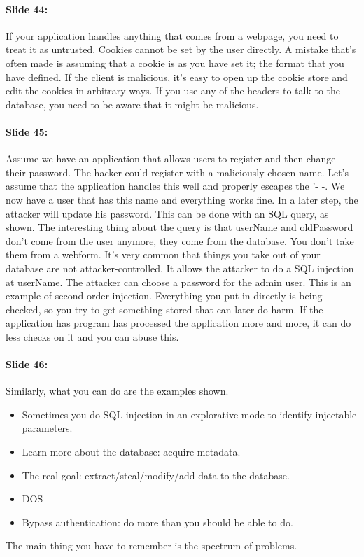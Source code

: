 \documentclass[10pt,a4paper]{report}
\begin{document}
\paragraph{Slide 44:} If your application handles anything that comes from a webpage, you need to treat it as untrusted. Cookies cannot be set by the user directly. A mistake that's often made is assuming that a cookie is as you have set it; the format that you have defined. If the client is malicious, it's easy to open up the cookie store and edit the cookies in arbitrary ways. If you use any of the headers to talk to the database, you need to be aware that it might be malicious. 

\paragraph{Slide 45:} Assume we have an application that allows users to register and then change their password. The hacker could register with a maliciously chosen name. Let's assume that the application handles this well and properly escapes the '- -. We now have a user that has this name and everything works fine. In a later step, the attacker will update his password. This can be done with an SQL query, as shown. The interesting thing about the query is that userName and oldPassword don't come from the user anymore, they come from the database. You don't take them from a webform. It's very common that things you take out of your database are not attacker-controlled. It allows the attacker to do a SQL injection at userName. The attacker can choose a password for the admin user. This is an example of second order injection. Everything you put in directly is being checked, so you try to get something stored that can later do harm. If the application has program has processed the application more and more, it can do less checks on it and you can abuse this.

\paragraph{Slide 46:} Similarly, what you can do are the examples shown. 
\begin{itemize}
\item Sometimes you do SQL injection in an explorative mode to identify injectable parameters. 
\item Learn more about the database: acquire metadata.
\item The real goal: extract/steal/modify/add data to the database.
\item DOS
\item Bypass authentication: do more than you should be able to do. 
\end{itemize}
The main thing you have to remember is the spectrum of problems.
\end{document}
